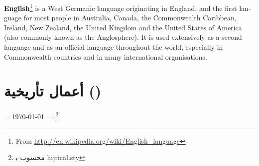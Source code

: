 \documentclass[a4paper]{article}
\begin{document}
\begin{english}
\textbf{English}\footnote{\rmfamily From \url{http://en.wikipedia.org/wiki/English_language}} is a West Germanic language originating in England, and the first language for most people in Australia, Canada, the Commonwealth Caribbean, Ireland, New Zealand, the United Kingdom and the United States of America (also commonly known as the Anglosphere). It is used extensively as a second language and as an official language throughout the world, especially in Commonwealth countries and in many international organisations.
%

\end{english}
\bigskip

\setRL\arabicfont

\section{\arabicfont أعمال تأريخية ()}


\LR{\localenglish{\rmfamily\today}} = \today\ = \Hijritoday  \footnote{ محسوب ب‍ \textsf{hijrical.sty}} 
\end{document}
